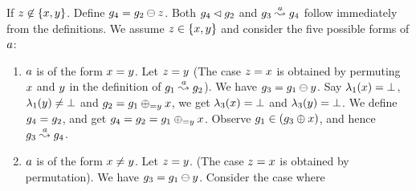 \begin{enumerate}
If $z\not\in\left\{x,y\right\}$.
Define $g_4=g_2\ominus{\ensuremath{z}}$.
Both $g_4\lhd g_2$ and 
$g_3\stackrel{a}{\leadsto}g_4$ follow immediately
from the definitions.
%
We assume $z\in\left\{x,y\right\}$
and consider
the five possible forms of $a$:
%
\begin{enumerate}
\item $a$ is of the form $x=y$.
%  
  Let $z=y$ (The case $z=x$ is obtained 
  by permuting $x$ and $y$ in the definition of 
  $g_1\stackrel{a}{\leadsto}g_2$).
  We have $g_3=g_1\ominus{\ensuremath{y}}$.
  Say 
  $\lambda_1(x)=\bot$,
  $\lambda_1(y)\neq\bot$ and
  $g_2=g_1\oplus_{={y}}{x}$, we get 
  $\lambda_3(x)=\bot$ and
  $\lambda_3(y)=\bot$.
  We define $g_4=g_2$, 
  and get $g_4=g_2=g_1\oplus_{={y}}{x}$.
  Observe $g_1\in(g_3\oplus{\ensuremath{x}})$, and hence
  $g_3\stackrel{a}{\leadsto}g_4$.
%
\item $a$ is of the form $x\neq y$.
  Let $z=y$.
  (The case $z=x$ is obtained 
  by permutation).
  We have $g_3=g_1\ominus{\ensuremath{y}}$.
  Consider the case where

\end{enumerate}
\end{enumerate}
